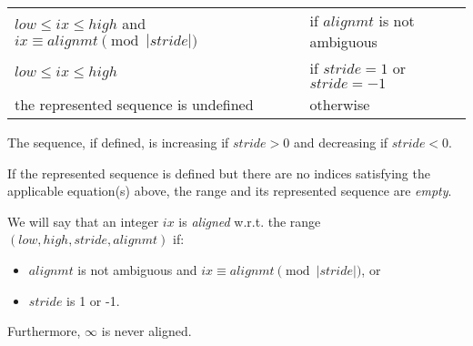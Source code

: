\begin{tabular}{ll}

$low \leq ix \leq high$ and $ix \equiv alignmt \pmod{|stride|}$ &
 if $alignmt$ is not ambiguous \\
$low \leq ix \leq high$ &
 if $stride = 1$ or $stride = -1$ \\
the represented sequence is undefined &
 otherwise

\end{tabular}

The sequence, if defined, is increasing if $stride > 0$ and decreasing if $stride < 0$.

If the represented sequence is defined but
there are no indices satisfying the applicable equation(s) above,
the range and its represented sequence are \emph{empty}.

We will say that an integer $ix$ is \emph{aligned}
w.r.t. the range $(low, high, stride, alignmt)$
if:
\begin{itemize}
\item $alignmt$ is not ambiguous and $ix \equiv alignmt \pmod{|stride|}$, or
\item $stride$ is 1 or -1.
\end{itemize}
\noindent Furthermore, $\infty$ is never aligned.

